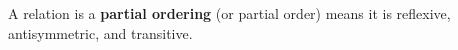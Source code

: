 
A relation is a {\bf partial ordering} (or partial order) means 
it is reflexive, antisymmetric, and transitive.